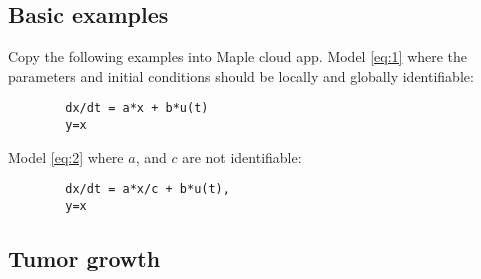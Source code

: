 \documentclass[10pt]{beamer}
\begin{document}


\subsection{Basic examples}

\begin{frame}[fragile]{Copy the following examples into Maple cloud app.}
	Model \eqref{eq:1} where the parameters and initial conditions should be locally and globally identifiable:
	\begin{lstlisting}
		dx/dt = a*x + b*u(t)
		y=x
	\end{lstlisting}
\vspace{20pt}
	Model \eqref{eq:2} where $a$, and $c$ are not identifiable:
	\begin{lstlisting}
		dx/dt = a*x/c + b*u(t),
		y=x
	\end{lstlisting}
\end{frame}

\subsection{Tumor growth}
\end{document}
